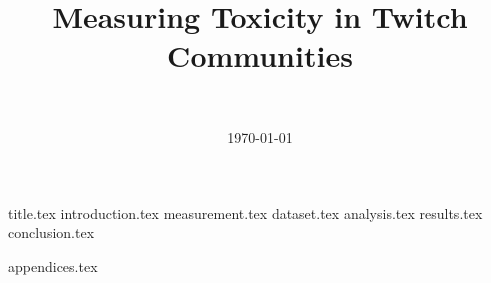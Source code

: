 \documentclass[final]{report}
\title{Measuring Toxicity in Twitch Communities}
\author{~}
\date{\today}
\begin{document}

{title.tex}
\newpage
{}\label{ch:contents}
\tableofcontents
\newpage
{}
{introduction.tex}
{measurement.tex}
{dataset.tex}
{analysis.tex}
{results.tex}
{conclusion.tex}
\newpage
{}

\printbibliography
{appendices.tex}
\end{document}
